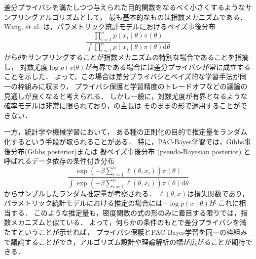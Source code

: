 \documentclass{jarticle}
\newcommand{\dd}{\mathrm{d}}
\theoremstyle{definition}
\begin{document}
差分プライバシを満たしつつ与えられた目的関数をなるべく小さくするようなサンプリングアルゴリズムとして，
最も基本的なものは指数メカニズム\cite{McSherry2007}である．
Wang, et al. \cite{Wang2015b}は，パラメトリック統計モデルにおけるベイズ事後分布
\begin{equation}
\frac{\prod_{i=1}^{n} p(x_i \mid \theta) \pi(\theta)}
{\int \prod_{i=1}^{n} p(x_i \mid \theta) \pi(\theta) \dd\theta}
\end{equation}
から$\theta$をサンプリングすることが指数メカニズムの特別な場合であることを指摘し，
対数尤度$\log p(x|\theta)$が有界である場合には差分プライバシが常に成立することを示した．
よって，この場合は差分プライバシとベイズ的な学習手法が同一の枠組みに収まり，
プライバシ保護と学習精度のトレードオフなどの議論の見通しが良くなると考えられる．
しかし一般に，対数尤度が有界となるような確率モデルは非常に限られており，\cite{Wang2015b}の主張は
そのままの形で適用することができない．

一方，統計学や機械学習において，
ある種の正則化の目的で推定量をランダム化するという手段が取られることがある．
特に，PAC-Bayes学習\cite{Catoni2004,Catoni2007}では，Gibbs事後分布(Gibbs posterior)または
擬ベイズ事後分布 (pseudo-Bayesian posterior) と呼ばれるデータ依存の条件付き分布
\begin{equation}
\frac{\exp \left( -\beta \sum_{i=1}^{n} \ell(\theta, x_i) \right) \pi(\theta)}
{\int \exp \left( -\beta \sum_{i=1}^{n} \ell(\theta, x_i) \right) \pi(\theta)\dd \theta}
\label{eq:pseudo_posterior}
\end{equation}
からサンプルしたランダム推定量が考察される．
$\ell(\theta, x)$は損失関数であり，パラメトリック統計モデルにおける推定の場合には$-\log p(x\mid\theta)$が
これに相当する．
このような推定量も，密度関数の式の形のみに着目する限りでは，指数メカニズムと似ている．
よって，何らかの条件のもとで差分プライバシを満たすということが示せれば，
プライバシ保護とPAC-Bayes学習を同一の枠組みで議論することができ，アルゴリズム設計や理論解析の幅が広がることが期待できる．
\end{document}
